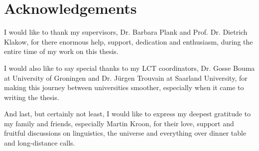 \chapter*{Acknowledgements}

I would like to thank my supervisors, Dr. Barbara Plank and Prof. Dr. Dietrich Klakow, for there enormous help, support, dedication and enthusiasm, during the entire time of my work on this thesis.

I would also like to say special thanks to my LCT coordinators, Dr. Gosse Bouma at University of Groningen and Dr. Jürgen Trouvain at Saarland University, for making this journey between universities smoother, especially when it came to writing the thesis.

And last, but certainly not least, I would like to express my deepest gratitude to my family and friends, especially Martin Kroon, for their love, support and fruitful discussions on linguistics, the universe and everything over dinner table and long-distance calls.